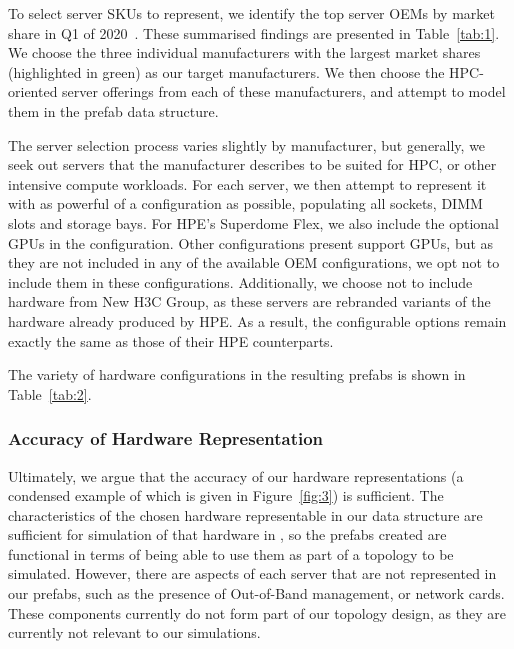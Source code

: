 \documentclass[11pt]{article}
\begin{document}
			To select server SKUs to represent, we identify the top server OEMs by market share in Q1 of 2020~\cite{Macatee2020}. These summarised findings are presented in Table~\ref{tab:1}.
			We choose the three individual manufacturers with the largest market shares (highlighted in green) as our target manufacturers.
			We then choose the HPC-oriented server offerings from each of these manufacturers, and attempt to model them in the prefab data structure.
			
			The server selection process varies slightly by manufacturer, but generally, we seek out servers that the manufacturer describes to be suited for HPC, or other intensive compute workloads.
			For each server, we then attempt to represent it with as powerful of a configuration as possible, populating all sockets, DIMM slots and storage bays.
			For HPE's Superdome Flex, we also include the optional GPUs in the configuration.
			Other configurations present support GPUs, but as they are not included in any of the available OEM configurations, we opt not to include them in these configurations.
			Additionally, we choose not to include hardware from New H3C Group, as these servers are rebranded variants of the hardware already produced by HPE.
			As a result, the configurable options remain exactly the same as those of their HPE counterparts.

			The variety of hardware configurations in the resulting prefabs is shown in Table~\ref{tab:2}.



		\subsubsection{Accuracy of Hardware Representation}
			Ultimately, we argue that the accuracy of our hardware representations (a condensed example of which is given in Figure~\ref{fig:3}) is sufficient.
			The characteristics of the chosen hardware representable in our data structure are sufficient for simulation of that hardware in \opendc{}, so the prefabs created are functional in terms of being able to use them as part of a topology to be simulated.
			However, there are aspects of each server that are not represented in our prefabs, such as the presence of Out-of-Band management, or network cards.
			These components currently do not form part of our topology design, as they are currently not relevant to our simulations.
\end{document}
